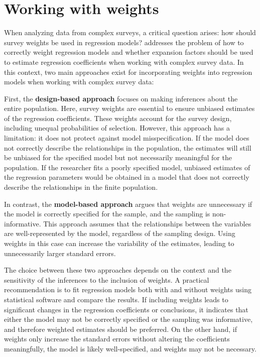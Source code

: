 \documentclass[
  12pt,
]{book}
\begin{document}
\hypertarget{working-with-weights}{%
\section{Working with weights}\label{working-with-weights}}

When analyzing data from complex surveys, a critical question arises: how should survey weights be used in regression models? \citet{Heeringa_West_Berglund_2017} addresses the problem of how to correctly weight regression models and whether expansion factors should be used to estimate regression coefficients when working with complex survey data. In this context, two main approaches exist for incorporating weights into regression models when working with complex survey data:

First, the \textbf{design-based approach} focuses on making inferences about the entire population. Here, survey weights are essential to ensure unbiased estimates of the regression coefficients. These weights account for the survey design, including unequal probabilities of selection. However, this approach has a limitation: it does not protect against model misspecification. If the model does not correctly describe the relationships in the population, the estimates will still be unbiased for the specified model but not necessarily meaningful for the population. If the researcher fits a poorly specified model, unbiased estimates of the regression parameters would be obtained in a model that does not correctly describe the relationships in the finite population.

In contrast, the \textbf{model-based approach} argues that weights are unnecessary if the model is correctly specified for the sample, and the sampling is non-informative. This approach assumes that the relationships between the variables are well-represented by the model, regardless of the sampling design. Using weights in this case can increase the variability of the estimates, leading to unnecessarily larger standard errors.

The choice between these two approaches depends on the context and the sensitivity of the inferences to the inclusion of weights. A practical recommendation is to fit regression models both with and without weights using statistical software and compare the results. If including weights leads to significant changes in the regression coefficients or conclusions, it indicates that either the model may not be correctly specified or the sampling was informative, and therefore weighted estimates should be preferred. On the other hand, if weights only increase the standard errors without altering the coefficients meaningfully, the model is likely well-specified, and weights may not be necessary.
\end{document}
